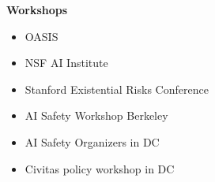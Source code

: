 \documentclass[10pt]{article}
\newcommand{\headingTwo}[2]{
    \vspace*{6pt}
    \textbf{#1 \hfill #2}
}
\newcommand{\resumeListHeading}[1]{\vspace*{5pt}\textbf{#1}}
\begin{document}
\headingTwo{Workshops}{}
\begin{itemize}
    \item OASIS
    \item NSF AI Institute
    \item Stanford Existential Risks Conference
    \item AI Safety Workshop Berkeley
    \item AI Safety Organizers in DC
    \item Civitas policy workshop in DC
\end{itemize}










\end{document}
